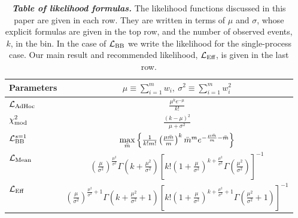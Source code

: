 \begin{table}[h!]
\centering
\begin{tabular}{l | c}
\toprule
Parameters & $\mu \equiv \sum_{i=1}^m w_i, ~ \sigma^2 \equiv \sum_{i=1}^m w_i^2$ \\
\hline\hline
$\mathcal{L}_{\textmd{AdHoc}}$ & $\frac{\mu^{k}e^{-\mu}}{k!}$\\ \hline
$\chi^2_{\rm mod}$ & $\frac{(k - \mu)^2}{\mu + \sigma^2}$ \\ \hline
$\mathcal{L}_{\textmd{BB}}^{s=1}$ & $\underset{\bar m}{\rm max} \left\{
\frac{1}{k!m!} \left(\frac{\mu \bar m}{m}\right)^{k}\bar m^{m} e^{-\frac{\mu \bar m}{m} -\bar m} \right\}$ \\ \hline
$\mathcal{L}_{\textmd{Mean}}$ & $\left(\frac{\mu}{\sigma^2}\right)^{\frac{\mu^2}{\sigma^2}}\Gamma\left(k+\frac{\mu^2}{\sigma^2}\right)\left[k!\left(1+\frac{\mu}{\sigma^2}\right)^{k+\frac{\mu^2}{\sigma^2}}\Gamma\left(\frac{\mu^2}{\sigma^2}\right)\right]^{-1}$ \\ \hline
$\mathcal{L}_\textmd{Eff}$ & $\left(\frac{\mu}{\sigma^2}\right)^{\frac{\mu^2}{\sigma^2}+1}\Gamma\left(k+\frac{\mu^2}{\sigma^2}+1\right)\left[k!\left(1+\frac{\mu}{\sigma^2}\right)^{k+\frac{\mu^2}{\sigma^2}+1}\Gamma\left(\frac{\mu^2}{\sigma^2}+1\right)\right]^{-1}$ \\
\bottomrule
\end{tabular}
\caption{\textbf{\textit{Table of likelihood formulas.}} The likelihood functions discussed in this paper are given in each row. They are written in terms of $\mu$ and $\sigma$, whose explicit formulas are given in the top row, and the number of observed events, $k$, in the bin. In the case of $\mathcal{L}_{\textmd{BB}}$ we write the likelihood for the single-process case. Our main result and recommended likelihood, $\mathcal{L}_\textmd{Eff}$, is given in the last row.}
\label{tbl:likelihoods}
\end{table}
